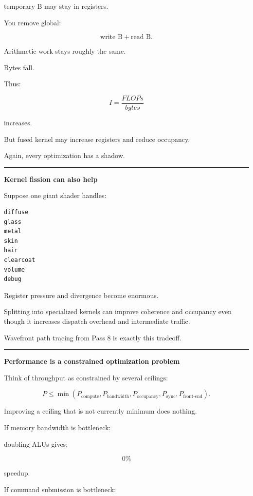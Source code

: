 temporary B may stay in registers.

You remove global:

\[
\text{write B}+\text{read B}.
\]

Arithmetic work stays roughly the same.

Bytes fall.

Thus:

\[
\boxed{
I=\frac{FLOPs}{bytes}
}
\]

increases.

But fused kernel may increase registers and reduce occupancy.

Again, every optimization has a shadow.

\begin{center}\rule{0.5\linewidth}{0.5pt}\end{center}

\textbf{Kernel fission can also help}

Suppose one giant shader handles:

\protect{}\label{p10-mega}%
\begin{verbatim}
diffuse
glass
metal
skin
hair
clearcoat
volume
debug
\end{verbatim}

Register pressure and divergence become enormous.

Splitting into specialized kernels can improve coherence and occupancy even though it increases dispatch overhead and intermediate traffic.

Wavefront path tracing from Pass 8 is exactly this tradeoff.

\begin{center}\rule{0.5\linewidth}{0.5pt}\end{center}

\textbf{Performance is a constrained optimization problem}

Think of throughput as constrained by several ceilings:

\[
\boxed{
P
\le
\min(
P_{\text{compute}},
P_{\text{bandwidth}},
P_{\text{occupancy}},
P_{\text{sync}},
P_{\text{front-end}}
).
}
\]

Improving a ceiling that is not currently minimum does nothing.

If memory bandwidth is bottleneck:

doubling ALUs gives:

\[
0\%
\]

speedup.

If command submission is bottleneck:

